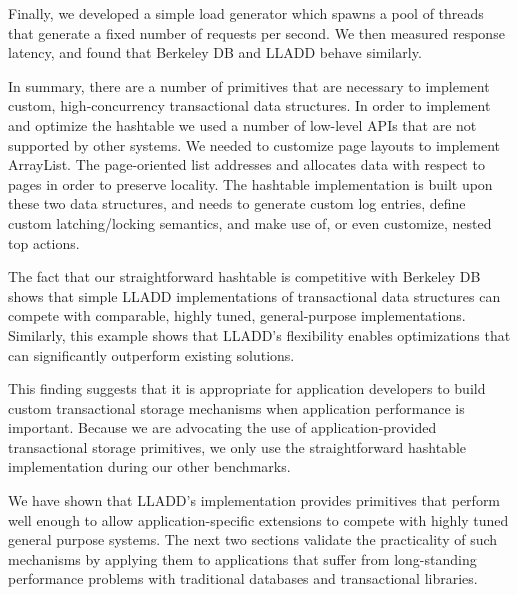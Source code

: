 \documentclass[10pt,letterpaper,twocolumn,english]{article}
\newcommand{\yad}{LLADD\xspace}
\begin{document}

Finally, we developed a simple load generator which spawns a pool of threads that
generate a fixed number of requests per second.  We then measured
response latency, and found that Berkeley DB and \yad behave
similarly.

In summary, there are a number of primitives that are necessary to
implement custom, high-concurrency transactional data structures.  In
order to implement and optimize the hashtable we used a number of
low-level APIs that are not supported by other systems.  We needed to
customize page layouts to implement ArrayList.  The page-oriented list
addresses and allocates data with respect to pages in order to
preserve locality.  The hashtable implementation is built upon these
two data structures, and needs to generate custom log
entries, define custom latching/locking semantics, and make use of, or
even customize, nested top actions.

The fact that our straightforward hashtable is competitive with Berkeley DB
shows that simple \yad implementations of transactional data structures
can compete with comparable, highly tuned, general-purpose
implementations.  Similarly, this example shows that \yad's flexibility 
enables optimizations that can significantly
outperform existing solutions.  

This finding suggests that it is appropriate for
application developers to build custom
transactional storage mechanisms when application performance is
important.  Because we are advocating the use of 
application-provided transactional storage primitives, we only use the 
straightforward hashtable implementation during our other benchmarks.


We have shown that \yad's implementation provides primitives that perform 
well enough to allow application-specific extensions to compete with highly 
tuned general purpose systems.  The next two sections validate the 
practicality of such mechanisms by applying them to applications 
that suffer from long-standing performance problems with traditional databases
and transactional libraries.
\end{document}
